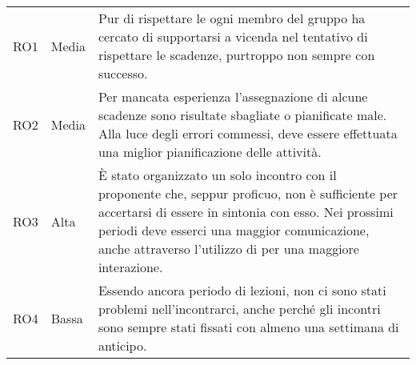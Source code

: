 {\begin{longtable}{C{2cm} C{3cm} C{10cm}}
RO1 &
Media &
Pur di rispettare le  ogni membro del gruppo ha cercato di supportarsi a vicenda nel tentativo di rispettare le scadenze, purtroppo non sempre con successo. \\

RO2 &
Media &
Per mancata esperienza l'assegnazione di alcune scadenze sono risultate sbagliate o pianificate male. Alla luce degli errori commessi, deve essere effettuata una miglior pianificazione delle attività. \\

RO3 &
Alta &
È stato organizzato un solo incontro con il proponente che, seppur proficuo, non è sufficiente per accertarsi di essere in sintonia con esso. Nei prossimi periodi deve esserci una maggior comunicazione, anche attraverso l'utilizzo di  per una maggiore interazione. \\

RO4 &
Bassa &
Essendo ancora periodo di lezioni, non ci sono stati problemi nell'incontrarci, anche perché gli incontri sono sempre stati fissati con almeno una settimana di anticipo. \\

\end{longtable}	
}